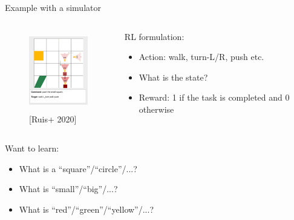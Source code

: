 \documentclass[usenames,dvipsnames,11pt,aspectratio=169]{beamer}
\begin{document}
\begin{frame}
    {Example with a simulator}
    \begin{columns}
        \begin{column}{0.4\textwidth}
    \begin{figure}
        \includegraphics[height=3.5cm]{figures/instruction}
        \caption{[Ruis+ 2020]}
    \end{figure}
        \end{column}

        \begin{column}{0.6\textwidth}
            RL formulation:\\
    \begin{itemize}
        \item Action: walk, turn-L/R, push etc.
        \item What is the state? 
        \item Reward: 1 if the task is completed and 0 otherwise
    \end{itemize}
        \end{column}
    \end{columns}
    Want to learn:\\
    \begin{itemize}
        \item What is a ``square''/``circle''/...?
        \item What is ``small''/``big''/...?
        \item What is ``red''/``green''/``yellow''/...?
    \end{itemize}
\end{frame}
\end{document}
